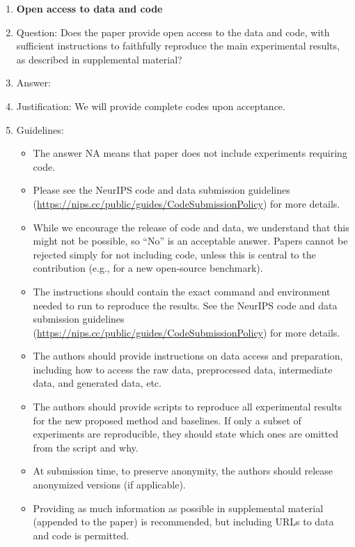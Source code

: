 \documentclass{article}
\numberwithin{equation}{section}
\theoremstyle{definition}
\begin{document}
\begin{enumerate}
\item {\bf Open access to data and code}
    \item[] Question: Does the paper provide open access to the data and code, with sufficient instructions to faithfully reproduce the main experimental results, as described in supplemental material?
    \item[] Answer: \answerNo{} %
    \item[] Justification: We will provide complete codes upon acceptance.
    \item[] Guidelines:
    \begin{itemize}
        \item The answer NA means that paper does not include experiments requiring code.
        \item Please see the NeurIPS code and data submission guidelines (\url{https://nips.cc/public/guides/CodeSubmissionPolicy}) for more details.
        \item While we encourage the release of code and data, we understand that this might not be possible, so “No” is an acceptable answer. Papers cannot be rejected simply for not including code, unless this is central to the contribution (e.g., for a new open-source benchmark).
        \item The instructions should contain the exact command and environment needed to run to reproduce the results. See the NeurIPS code and data submission guidelines (\url{https://nips.cc/public/guides/CodeSubmissionPolicy}) for more details.
        \item The authors should provide instructions on data access and preparation, including how to access the raw data, preprocessed data, intermediate data, and generated data, etc.
        \item The authors should provide scripts to reproduce all experimental results for the new proposed method and baselines. If only a subset of experiments are reproducible, they should state which ones are omitted from the script and why.
        \item At submission time, to preserve anonymity, the authors should release anonymized versions (if applicable).
        \item Providing as much information as possible in supplemental material (appended to the paper) is recommended, but including URLs to data and code is permitted.
    \end{itemize}



\end{enumerate}
\end{document}
